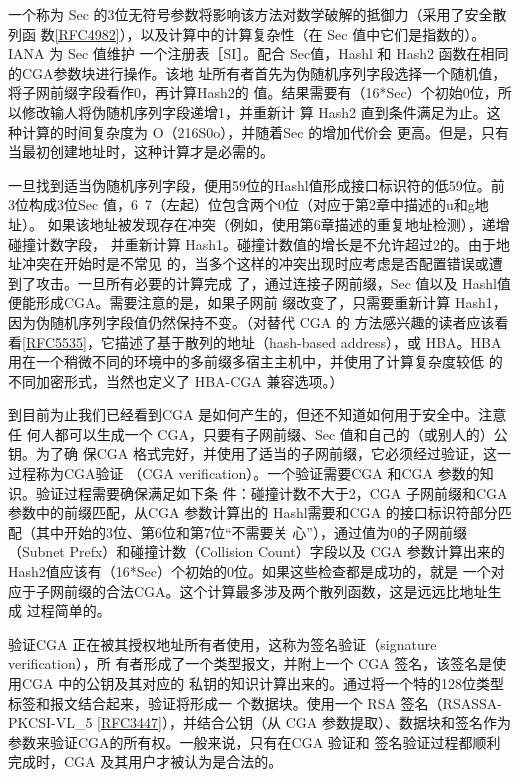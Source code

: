 一个称为 Sec 的3位无符号参数将影响该方法对数学破解的抵御力（采用了安全散列函
数\href{https://www.rfc-editor.org/rfc/rfc4982}{[RFC4982]}），以及计算中的计算复杂性（在 Sec 值中它们是指数的）。IANA 为 Sec 值维护
一个注册表［SI］。配合 Sec值，Hashl 和 Hash2 函数在相同的CGA参数块进行操作。该地
址所有者首先为伪随机序列字段选择一个随机值，将子网前缀字段看作0，再计算Hash2的
值。结果需要有（16*Sec）个初始0位，所以修改输人将伪随机序列字段递增1，并重新计
算 Hash2 直到条件满足为止。这种计算的时间复杂度为 O（216S0o），并随着Sec 的增加代价会
更高。但是，只有当最初创建地址时，这种计算才是必需的。

一旦找到适当伪随机序列字段，便用59位的Hashl值形成接口标识符的低59位。前
3位构成3位Sec 值，6~7（左起）位包含两个0位（对应于第2章中描述的u和g地址）。
如果该地址被发现存在冲突（例如，使用第6章描述的重复地址检测），递增碰撞计数字段，
并重新计算 Hash1。碰撞计数值的增长是不允许超过2的。由于地址冲突在开始时是不常见
的，当多个这样的冲突出现时应考虑是否配置错误或遭到了攻击。一旦所有必要的计算完成
了，通过连接子网前缀，Sec 值以及 Hashl值便能形成CGA。需要注意的是，如果子网前
缀改变了，只需要重新计算 Hash1，因为伪随机序列字段值仍然保持不变。（对替代 CGA 的
方法感兴趣的读者应该看看\href{https://www.rfc-editor.org/rfc/rfc5535}{[RFC5535]}，它描述了基于散列的地址（hash-based address），或
HBA。HBA 用在一个稍微不同的环境中的多前缀多宿主主机中，并使用了计算复杂度较低
的不同加密形式，当然也定义了 HBA-CGA 兼容选项。）

到目前为止我们已经看到CGA 是如何产生的，但还不知道如何用于安全中。注意任
何人都可以生成一个 CGA，只要有子网前缀、Sec 值和自己的（或别人的）公钥。为了确
保CGA 格式完好，并使用了适当的子网前缀，它必须经过验证，这一过程称为CGA验证
（CGA verification）。一个验证需要CGA 和CGA 参数的知识。验证过程需要确保满足如下条
件：碰撞计数不大于2，CGA 子网前缀和CGA 参数中的前缀匹配，从CGA 参数计算出的
Hashl需要和CGA 的接口标识符部分匹配（其中开始的3位、第6位和第7位“不需要关
心”），通过值为0的子网前缀（Subnet Prefx）和碰撞计数（Collision Count）字段以及 CGA
参数计算出来的 Hash2值应该有（16*Sec）个初始的0位。如果这些检查都是成功的，就是
一个对应于子网前缀的合法CGA。这个计算最多涉及两个散列函数，这是远远比地址生成
过程简单的。

验证CGA 正在被其授权地址所有者使用，这称为签名验证（signature verification），所
有者形成了一个类型报文，并附上一个 CGA 签名，该签名是使用CGA 中的公钥及其对应的
私钥的知识计算出来的。通过将一个特的128位类型标签和报文结合起来，验证将形成一
个数据块。使用一个 RSA 签名（RSASSA-PKCSI-VL\_5 \href{https://www.rfc-editor.org/rfc/rfc3447}{[RFC3447]}），并结合公钥（从 CGA
参数提取）、数据块和签名作为参数来验证CGA的所有权。一般来说，只有在CGA 验证和
签名验证过程都顺利完成时，CGA 及其用户才被认为是合法的。

